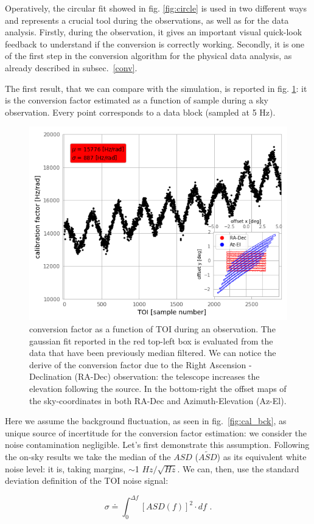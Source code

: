 \documentclass[twocolumn,traditabstract]{aa}\\
\begin{document}
\noindent Operatively, the circular fit showed in fig. \ref{fig:circle} is used in two different ways and represents a crucial tool during the observations, as well as for the data analysis. Firstly, during the observation, it gives an important visual quick-look feedback to understand if the conversion is correctly working. Secondly, it is one of the first step in the conversion algorithm for the physical data analysis, as already described in subsec.~\ref{conv}.

The first result, that we can compare with the simulation, is reported in fig. \ref{fig:calfact}: it is the conversion factor estimated as a function of sample during a sky observation. Every point corresponds to a data block (sampled at 5 Hz).

\begin{figure}[htf]
	\centering
	\includegraphics[width=.5\textwidth]{4.results/calfact.png}
	\caption{conversion factor as a function of TOI during an observation. The gaussian fit reported in the red top-left box is evaluated from the data that have been previously median filtered. We can notice the derive of the conversion factor due to the Right Ascension - Declination (RA-Dec) observation: the telescope increases the elevation following the source. In the bottom-right the offset maps of the sky-coordinates in both RA-Dec and Azimuth-Elevation (Az-El).}
	\label{fig:calfact}
\end{figure}


Here we assume the background fluctuation, as seen in fig.~\ref{fig:cal_bck}, as unique source of incertitude for the conversion factor estimation: we consider the noise contamination negligible. Let's first demonstrate this assumption. Following the on-sky results we take the median of the $ASD$ ($\tilde{ASD}$) as its equivalent white noise level: it is, taking margins, $\sim$1 $Hz/\sqrt{Hz}$.
\noindent  We can, then, use the standard deviation definition of the TOI noise signal:

\begin{equation}
\sigma \doteq \int_{0}^{\Delta f} \left[ASD(f) \right]^2\cdot df \text{ .}
\label{eq:sigma}
\end{equation}
\end{document}
